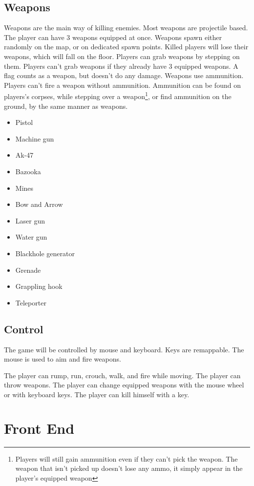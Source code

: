 \documentclass{article}
\begin{document}
\subsection{Weapons}
\label{Weapons}
\label{Step}
\label{Flag}
Weapons are the main way of killing enemies. Most weapons are projectile based. The player can have 3 weapons equipped at once. Weapons spawn either randomly on the map, or on dedicated spawn points. Killed players will lose their weapons, which will fall on the floor. Players can grab weapons by stepping on them. Players can't grab weapons if they already have 3 equipped weapons. A flag counts as a weapon, but doesn't do any damage. Weapons use ammunition. Players can't fire a weapon without ammunition. Ammunition can be found on players's corpses, while stepping over a weapon\footnote{Players will still gain ammunition even if they can't pick the weapon. The weapon that isn't picked up doesn't lose any ammo, it simply appear in the player's equipped weapon}, or find ammunition on the ground, by the same manner as weapons.
\begin{itemize}
\item Pistol
\item Machine gun
\item Ak-47
\item Bazooka
\item Mines
\item Bow and Arrow
\item Laser gun
\item Water gun
\item Blackhole generator
\item Grenade
\item Grappling hook
\item Teleporter
\end{itemize}

\subsection{Control}
\label{Players}
The game will be controlled by mouse and keyboard. Keys are remappable. The mouse is used to aim and fire weapons.

The player can rump, run, crouch, walk, and fire while moving. The player can throw weapons. The player can change equipped weapons with the mouse wheel or with keyboard keys. The player can kill himself with a key.

\section{Front End}
\end{document}
